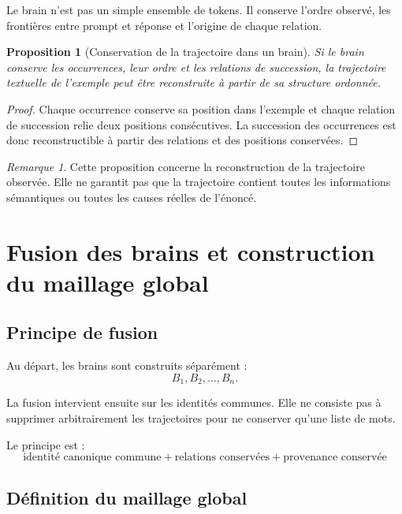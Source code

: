 \documentclass[11pt,a4paper]{report}
\theoremstyle{definition}
\theoremstyle{plain}
\newtheorem{proposition}[definition]{Proposition}
\theoremstyle{remark}
\newtheorem{remarque}[definition]{Remarque}
\begin{document}
Le brain n'est pas un simple ensemble de tokens. Il conserve
l'ordre observé, les frontières entre prompt et réponse et
l'origine de chaque relation.

\begin{proposition}[Conservation de la trajectoire dans un brain]
Si le brain conserve les occurrences, leur ordre et les relations
de succession, la trajectoire textuelle de l'exemple peut être
reconstruite à partir de sa structure ordonnée.
\end{proposition}

\begin{proof}
Chaque occurrence conserve sa position dans l'exemple et chaque
relation de succession relie deux positions consécutives.
La succession des occurrences est donc reconstructible à partir
des relations et des positions conservées.
\end{proof}

\begin{remarque}
Cette proposition concerne la reconstruction de la trajectoire
observée. Elle ne garantit pas que la trajectoire contient toutes
les informations sémantiques ou toutes les causes réelles de
l'énoncé.
\end{remarque}

\chapter{Fusion des brains et construction du maillage global}

\section{Principe de fusion}

Au départ, les brains sont construits séparément :
\[
B_1,B_2,\ldots,B_n.
\]

La fusion intervient ensuite sur les identités communes.
Elle ne consiste pas à supprimer arbitrairement les trajectoires
pour ne conserver qu'une liste de mots.

Le principe est :
\[
\boxed{
\text{identité canonique commune}
+
\text{relations conservées}
+
\text{provenance conservée}
}
\]

\section{Définition du maillage global}
\end{document}
